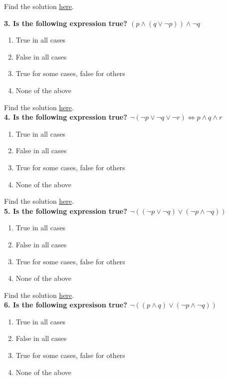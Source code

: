 Find the solution \hyperref[sec:raceXcertora_q2]{here}.\\

\pagebreak

\textbf{3. Is the following expression true? $(p\wedge(q\vee\neg p))\wedge\neg q$}

\begin{enumerate}[label=\Alph*.]
    \item True in all cases
    \item False in all cases
    \item True for some cases, false for others
    \item None of the above
\end{enumerate}

Find the solution \hyperref[sec:raceXcertora_q3]{here}.\\

\textbf{4. Is the following expression true? $\neg (\neg p\vee\neg q\vee\neg r)\Leftrightarrow p\wedge q\wedge r$}

\begin{enumerate}[label=\Alph*.]
    \item True in all cases
    \item False in all cases
    \item True for some cases, false for others
    \item None of the above
\end{enumerate}

Find the solution \hyperref[sec:raceXcertora_q4]{here}.\\

\textbf{5. Is the following expression true? $\neg((\neg p\vee\neg q)\vee (\neg p\wedge\neg q))$}

\begin{enumerate}[label=\Alph*.]
    \item True in all cases
    \item False in all cases
    \item True for some cases, false for others
    \item None of the above
\end{enumerate}

Find the solution \hyperref[sec:raceXcertora_q5]{here}.\\

\textbf{6. Is the following expresison true? $\neg((p\wedge q)\vee(\neg p\wedge\neg q))$}

\begin{enumerate}[label=\Alph*.]
    \item True in all cases
    \item False in all cases
    \item True for some cases, false for others
    \item None of the above
\end{enumerate}

